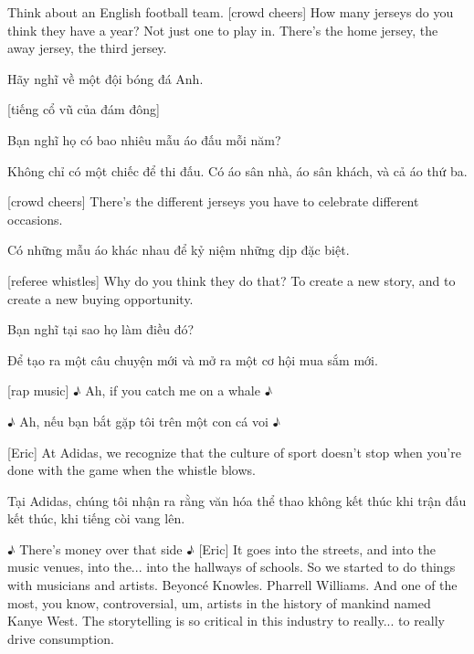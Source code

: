 \documentclass[a4paper]{article}
\begin{document}
	Think about an English football team.
	[crowd cheers]
	How many jerseys do you think they have a year?
	Not just one to play in. There's the home jersey, the away jersey, the third jersey.
	
	\begin{vietnamese-v2}
		Hãy nghĩ về một đội bóng đá Anh.
		
		[tiếng cổ vũ của đám đông]
		
		Bạn nghĩ họ có bao nhiêu mẫu áo đấu mỗi năm?
		
		Không chỉ có một chiếc để thi đấu. Có áo sân nhà, áo sân khách, và cả áo thứ ba.
	\end{vietnamese-v2}
	
	[crowd cheers]
	There's the different jerseys you have to celebrate different occasions.
	
	\begin{vietnamese-v2}
		
		Có những mẫu áo khác nhau để kỷ niệm những dịp đặc biệt.
	\end{vietnamese-v2}
	
	[referee whistles]
	Why do you think they do that?
	To create a new story, and to create a new buying opportunity.
	
	\begin{vietnamese-v2}
		
		Bạn nghĩ tại sao họ làm điều đó?
		
		Để tạo ra một câu chuyện mới và mở ra một cơ hội mua sắm mới.
	\end{vietnamese-v2}
	
	[rap music]
	♪ Ah, if you catch me on a whale ♪
	
	\begin{vietnamese-v2}
		
		♪ Ah, nếu bạn bắt gặp tôi trên một con cá voi ♪
	\end{vietnamese-v2}
	
	
	[Eric] At Adidas, we recognize that the culture of sport doesn't stop when you're done with the game when the whistle blows.
	
	\begin{vietnamese-v2}
		[Eric] Tại Adidas, chúng tôi nhận ra rằng văn hóa thể thao không kết thúc khi trận đấu kết thúc, khi tiếng còi vang lên.
	\end{vietnamese-v2}
	
	♪ There's money over that side ♪
	[Eric] It goes into the streets, and into the music venues, into the... into the hallways of schools.
	So we started to do things with musicians and artists.
	Beyoncé Knowles.
	Pharrell Williams.
	And one of the most, you know, controversial, um, artists in the history of mankind named Kanye West.
	The storytelling is so critical in this industry to really... to really drive consumption.
	
\end{document}
